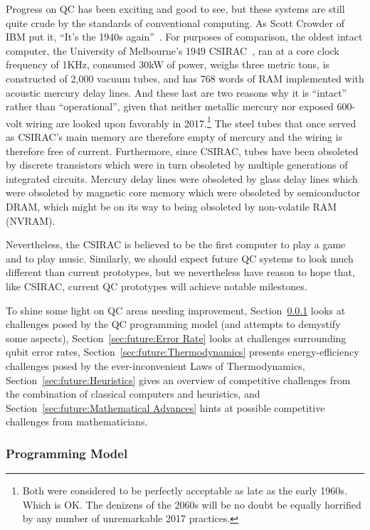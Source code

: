 Progress on QC has been exciting and good to see, but these systems are
still quite crude by the standards of conventional computing.
As Scott Crowder of IBM put it,
``It's the 1940s again''~\cite{BradJones2017IBM-QC-Crowder}.
For purposes of comparison, the oldest intact computer, the
University of Melbourne's 1949
CSIRAC~\cite{CSIRACMuseumVictoria,CSIRACUniversityMelbourne},
ran at a core clock frequency of 1KHz, consumed 30kW of power,
weighs three metric tons,
is constructed of 2,000 vacuum tubes, and has 768 words of RAM
implemented with acoustic mercury delay lines.
And these last are two reasons why it is ``intact'' rather than
``operational'', given that
neither metallic mercury nor exposed 600-volt wiring are
looked upon favorably in 2017.\footnote{
	Both were considered to be perfectly acceptable as late as the
	early 1960s.
	Which is OK.
	The denizens of the 2060s will be no doubt be equally horrified
	by any number of unremarkable 2017 practices.}
The steel tubes that once served as CSIRAC's main memory are therefore
empty of mercury and the wiring is therefore free of current.
Furthermore, since CSIRAC, tubes have been obsoleted by discrete
transistors which were in turn obsoleted by multiple generations of
integrated circuits.
Mercury delay lines were obsoleted by glass delay lines which were
obsoleted by magnetic core memory which were obsoleted by
semiconductor DRAM, which might be on its way to being obsoleted
by non-volatile RAM (NVRAM).

Nevertheless, the CSIRAC is believed to be the first computer to
play a game and to play music.
Similarly, we should expect future QC systems to look much different
than current prototypes, but we nevertheless have reason to hope that,
like CSIRAC, current QC prototypes will achieve notable milestones.

To shine some light on QC areas needing improvement,
Section~\ref{sec:future:Programming Model} looks at challenges posed by the QC
programming model (and attempts to demystify some aspects),
Section~\ref{sec:future:Error Rate} looks at challenges surrounding qubit
error rates,
Section~\ref{sec:future:Thermodynamics} presents energy-efficiency challenges
posed by the ever-inconvenient Laws of Thermodynamics,
Section~\ref{sec:future:Heuristics} gives an overview of competitive
challenges from the combination of classical computers and heuristics,
and
Section~\ref{sec:future:Mathematical Advances} hints at possible competitive
challenges from mathematicians.

\subsubsection{Programming Model}
\label{sec:future:Programming Model}

